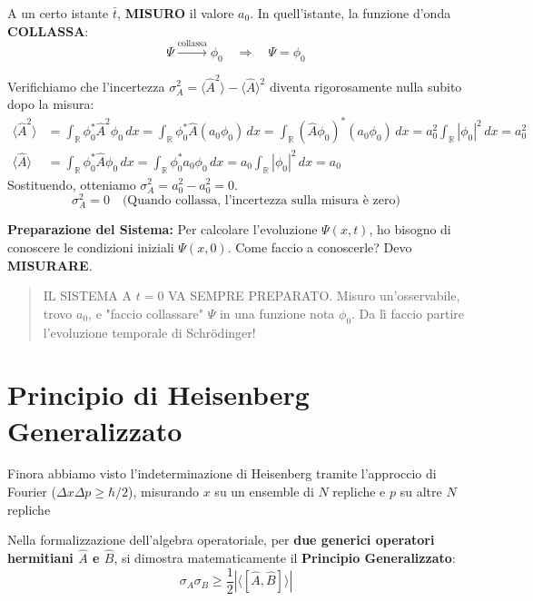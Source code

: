 \documentclass[11pt, a4paper]{article}
\begin{document}
\noindent
A un certo istante $\bar{t}$, \textbf{MISURO} il valore $a_0$. In quell'istante, la funzione d'onda \textbf{COLLASSA}: %
\begin{equation*}
    \Psi \xrightarrow{\text{collassa}} \phi_0 \quad \Rightarrow \quad \Psi = \phi_0 %
\end{equation*}

\noindent
Verifichiamo che l'incertezza $\sigma_A^2 = \langle \hat{A}^2 \rangle - \langle \hat{A} \rangle^2$ diventa rigorosamente nulla subito dopo la misura: %
\begin{align*}
    \langle \hat{A}^2 \rangle &= \int_{\mathbb{R}} \phi_0^* \hat{A}^2 \phi_0 \, dx = \int_{\mathbb{R}} \phi_0^* \hat{A} (a_0 \phi_0) \, dx = \int_{\mathbb{R}} (\hat{A}\phi_0)^* (a_0 \phi_0) \, dx = a_0^2 \int_{\mathbb{R}} |\phi_0|^2 \, dx = a_0^2 \\ %
    \langle \hat{A} \rangle &= \int_{\mathbb{R}} \phi_0^* \hat{A} \phi_0 \, dx = \int_{\mathbb{R}} \phi_0^* a_0 \phi_0 \, dx = a_0 \int_{\mathbb{R}} |\phi_0|^2 \, dx = a_0 %
\end{align*}
Sostituendo, otteniamo $\sigma_A^2 = a_0^2 - a_0^2 = 0$. %
\begin{equation}
    \boxed{ \sigma_A^2 = 0 } \quad \text{(Quando collassa, l'incertezza sulla misura è zero)} %
\end{equation}

\noindent
\textbf{Preparazione del Sistema:} %
Per calcolare l'evoluzione $\Psi(x,t)$, ho bisogno di conoscere le condizioni iniziali $\Psi(x,0)$. Come faccio a conoscerle? Devo \textbf{MISURARE}. %
\begin{quote}
    IL SISTEMA A $t=0$ VA SEMPRE PREPARATO. Misuro un'osservabile, trovo $a_0$, e "faccio collassare" $\Psi$ in una funzione nota $\phi_0$. Da lì faccio partire l'evoluzione temporale di Schrödinger! %
\end{quote}

\section{Principio di Heisenberg Generalizzato} %

Finora abbiamo visto l'indeterminazione di Heisenberg tramite l'approccio di Fourier ($\Delta x \Delta p \ge \hbar/2$), misurando $x$ su un ensemble di $N$ repliche e $p$ su altre $N$ repliche %

\noindent
Nella formalizzazione dell'algebra operatoriale, per \textbf{due generici operatori hermitiani $\hat{A}$ e $\hat{B}$}, si dimostra matematicamente il \textbf{Principio Generalizzato}: %
\begin{equation}
    \boxed{ \sigma_A \sigma_B \ge \frac{1}{2} \left| \langle [\hat{A}, \hat{B}] \rangle \right| } %
\end{equation}
\end{document}
